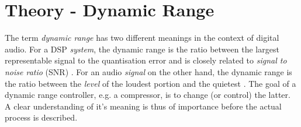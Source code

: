 \documentclass[../main2.tex]{subfiles}
\begin{document}
\FloatBarrier
\section{Theory - Dynamic Range} \label{theory_dynamic_range}
The term \emph{dynamic range} has two different meanings in the context of digital audio. For a DSP \emph{system}, the dynamic range is the ratio between the largest representable signal to the quantisation error and is closely related to \emph{signal to noise ratio} (SNR)  \cite{wilson1993filter}. For an audio \emph{signal} on the other hand, the dynamic range is the ratio between the \emph{level} of the loudest portion and the quietest \cite{davis1989sound}. The goal of a dynamic range controller, e.g. a compressor, is to change (or control) the latter. A clear understanding of it's meaning is thus of importance before the actual process is described.
\end{document}
